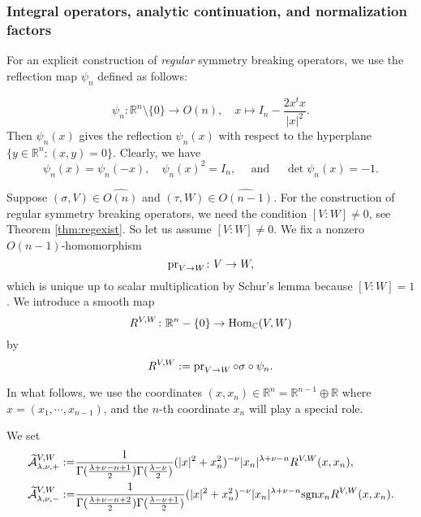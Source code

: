 \subsubsection{Integral operators, 
 analytic continuation, and normalization factors}
\label{subsec:VWSBO}

For an explicit construction of {\it{regular}} symmetry breaking operators,
 we use the reflection map 
$\psi_n$ defined as follows: 

\begin{equation}
\label{eqn:psim}
\psi_n \colon {\mathbb{R}}^n \setminus \{0\} \to O(n),
\quad
 x \mapsto I_n - \frac{2 x {}^{t\!} x}{|x|^2}.  
\end{equation}
Then $\psi_n(x)$ gives the reflection $\psi_n(x)$
 with respect to the hyperplane 
 $\{y \in {\mathbb{R}}^n:(x,y)=0\}$.  
Clearly,
 we have
\begin{equation}
\label{eqn:psix}
  \psi_n(x)=\psi_n(-x), 
\quad
\psi_n(x)^2=I_n, 
\quad
\text{ and }
\quad
\det \psi_n(x)=-1.  
\end{equation}



Suppose $(\sigma, V) \in \widehat{O(n)}$
 and $(\tau, W) \in \widehat{O(n-1)}$.  
For the construction of regular symmetry breaking operators,
 we need the condition $[V:W] \ne 0$, 
 see Theorem \ref{thm:regexist}.  
So let us assume 
$
[V:W] \ne 0.  
$
We fix a nonzero $O(n-1)$-homomorphism
\[
  \operatorname{pr}_{{V}\to{W}} \colon V \to W, 
\]
which is unique up to scalar multiplication
 by Schur's lemma
 because $[V:W]=1$.  
We introduce a smooth map
\[
R^{{V},{W}} \colon {\mathbb{R}}^n - \{ 0 \} 
            \to 
           \operatorname{Hom}_{\mathbb{C}}(V,W)
\]
by 
\begin{equation}
\label{eqn:RVW}
   R^{{V},{W}} := \operatorname{pr}_{{V}\to{W}}  \circ \sigma \circ \psi_n.  
\end{equation} 



In what follows,
 we use the coordinates $(x,x_n) \in {\mathbb{R}}^n = {\mathbb{R}}^{n-1} \oplus {\mathbb{R}}$
 where $x=(x_1, \cdots, x_{n-1})$, 
 and the $n$-th coordinate $x_n$
 will play a special role.  

We set
\begin{align}
\label{eqn:KVWpt}
\widetilde{{\mathcal{A}}}_{{\lambda},{\nu},{+}}^{{V,W}}
 :=&
\frac{1}{\Gamma(\frac{\lambda + \nu -n +1}{2})
         \Gamma(\frac{\lambda-\nu}{2})}
         (|x|^2+ x_n^2)^{-\nu}
|x_n|^{\lambda+\nu-n}
R^{{V},{W}} (x,x_n), 
\\
\label{eqn:KVWmt}
\widetilde{{\mathcal{A}}}_{{\lambda},{\nu},{-}}^{{V,W}}
 :=&
\frac{1}{\Gamma(\frac{\lambda + \nu -n +2}{2})
         \Gamma(\frac{\lambda-\nu+1}{2})}
         (|x|^2 +x_n^2)^{-\nu}
|x_n|^{\lambda+\nu-n}
 {\operatorname{sgn}} x_n
R^{{V},{W}} (x,x_n).  
\end{align}

